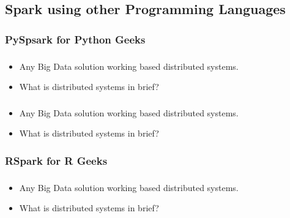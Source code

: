 
\subsection{Spark using other Programming Languages}

\subsubsection{PySpsark for Python Geeks}

\begin{frame}
  \frametitle{\subsecname}
	\begin{itemize}[<+->]
		\item Any Big Data solution working based distributed systems.
		\item What is distributed systems in brief?
	\end{itemize}
\end{frame}


\begin{frame}
  \frametitle{\subsecname}
	\begin{itemize}[<+->]
		\item Any Big Data solution working based distributed systems.
		\item What is distributed systems in brief?
	\end{itemize}
\end{frame}

\subsubsection{RSpark for R Geeks}

\begin{frame}
  \frametitle{\subsecname}
	\begin{itemize}[<+->]
		\item Any Big Data solution working based distributed systems.
		\item What is distributed systems in brief?
	\end{itemize}
\end{frame}

